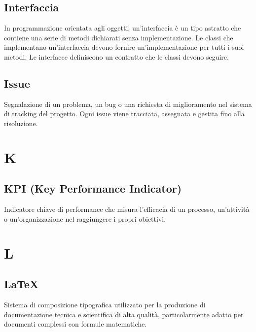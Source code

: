 \documentclass[a4paper,11pt]{article}
\begin{document}
\subsection{Interfaccia}
In programmazione orientata agli oggetti, un'interfaccia è un tipo astratto che contiene una serie di metodi dichiarati senza implementazione. Le classi che implementano un'interfaccia devono fornire un'implementazione per tutti i suoi metodi. Le interfacce definiscono un contratto che le classi devono seguire.









\subsection{Issue}
Segnalazione di un problema, un bug o una richiesta di miglioramento nel sistema di tracking del progetto. Ogni issue viene tracciata, assegnata e gestita fino alla risoluzione.

\newpage









\section{K}

\subsection{KPI (Key Performance Indicator)}
Indicatore chiave di performance che misura l'efficacia di un processo, un'attività o un'organizzazione nel raggiungere i propri obiettivi.

\newpage









\section{L}

\subsection{LaTeX}
Sistema di composizione tipografica utilizzato per la produzione di documentazione tecnica e scientifica di alta qualità, particolarmente adatto per documenti complessi con formule matematiche.
\end{document}
